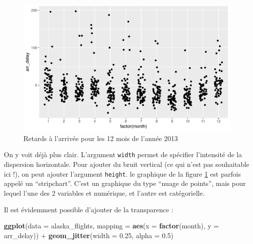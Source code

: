 \documentclass[a4paperpaper,]{article}
\newenvironment{Shaded}{\begin{snugshade}}{\end{snugshade}}
\newcommand{\DataTypeTok}[1]{\textcolor[rgb]{0.00,0.34,0.68}{#1}}
\newcommand{\FloatTok}[1]{\textcolor[rgb]{0.69,0.50,0.00}{#1}}
\newcommand{\KeywordTok}[1]{\textcolor[rgb]{0.12,0.11,0.11}{\textbf{#1}}}
\newcommand{\NormalTok}[1]{\textcolor[rgb]{0.12,0.11,0.11}{#1}}
\newcommand{\OperatorTok}[1]{\textcolor[rgb]{0.12,0.11,0.11}{#1}}
\newcommand{\StringTok}[1]{\textcolor[rgb]{0.75,0.01,0.01}{#1}}
\theoremstyle{definition}
\theoremstyle{definition}
\theoremstyle{definition}
\theoremstyle{remark}
\begin{document}
\begin{figure}[htpb]

{\centering \includegraphics[width=0.9\linewidth]{figure/jittering-1} 

}

\caption{Retards à l'arrivée pour les 12 mois de l'année 2013}\label{fig:jittering}
\end{figure}

On y voit déjà plus clair. L'argument \texttt{width} permet de spécifier
l'intensité de la dispersion horizontale. Pour ajouter du bruit vertical
(ce qui n'est pas souhaitable ici !), on peut ajouter l'argument
\texttt{height}. le graphique de la figure \ref{fig:jittering} est
parfois appelé un ``stripchart''. C'est un graphique du type ``nuage de
points'', mais pour lequel l'une des 2 variables et numérique, et
l'autre est catégorielle.

Il est évidemment possible d'ajouter de la transparence :

\begin{Shaded}
\begin{Highlighting}[]
\KeywordTok{ggplot}\NormalTok{(}\DataTypeTok{data =}\NormalTok{ alaska_flights, }\DataTypeTok{mapping =} \KeywordTok{aes}\NormalTok{(}\DataTypeTok{x =} \KeywordTok{factor}\NormalTok{(month), }\DataTypeTok{y =}\NormalTok{ arr_delay)) }\OperatorTok{+}
\StringTok{  }\KeywordTok{geom_jitter}\NormalTok{(}\DataTypeTok{width =} \FloatTok{0.25}\NormalTok{, }\DataTypeTok{alpha =} \FloatTok{0.5}\NormalTok{)}
\end{Highlighting}
\end{Shaded}
\end{document}
